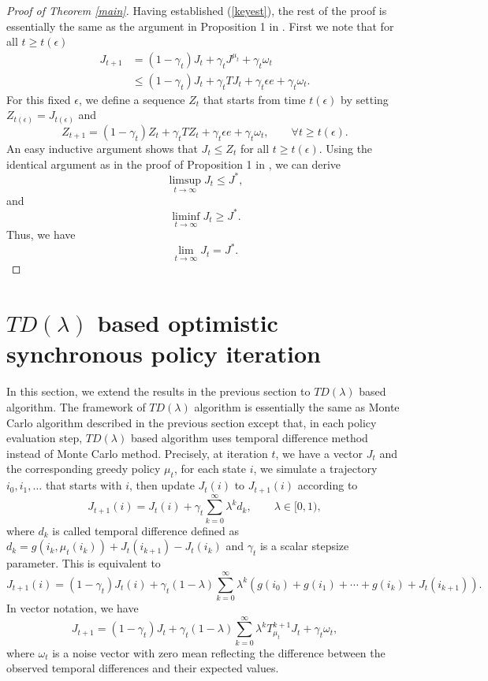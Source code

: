 \documentclass[12pt,a4paper]{amsart}
\numberwithin{equation}{section}
\theoremstyle{plain}
\theoremstyle{definition}
\begin{document}
\begin{proof} [Proof of Theorem \ref{main}]
	Having established (\ref{keyest}),  the rest of the proof is essentially the same as the argument in Proposition 1 in \cite{Ts03}. 
	 First we note that for all $t \ge t(\epsilon)$
	$$
	\begin{aligned}
	J_{t+1} & = (1-\gamma_t) J_t + \gamma_t J^{\mu_t} + \gamma_t \omega_t \\
	& \le (1-\gamma_t) J_t + \gamma_t TJ_t + \gamma_t \epsilon e + \gamma_t \omega_t.
	\end{aligned}
	$$
	For this fixed $\epsilon$,  we define a sequence $Z_t$ that starts from time $t(\epsilon)$ by setting $Z_{t(\epsilon)} = J_{t(\epsilon)}$ and 
	$$
	Z_{t+1} = (1-\gamma_t) Z_t + \gamma_t TZ_t + \gamma_t \epsilon e + \gamma_t \omega_t, \qquad \forall t \ge t(\epsilon).
	$$
	An easy inductive argument shows that $J_t \leq Z_t$ for all $t \ge t(\epsilon)$. Using the identical argument as in the proof of Proposition 1 in \cite{Ts03},  we can derive
	$$
	\limsup_{t  \to \infty} J_t \le J^{*}, 
	$$
	and
	$$
	\liminf_{t \to \infty} J_t \geq J^{*}. 
	$$ 
	Thus, we have 
	$$
	\lim_{t \to \infty} J_t = J^{*}. 
	$$
\end{proof}

\section{$TD(\lambda)$ based optimistic synchronous policy iteration}
In this section, we extend the results in the previous section to $TD(\lambda)$ based algorithm. The framework of $TD(\lambda)$ algorithm is essentially the same as Monte Carlo algorithm described in the previous section except that, in each policy evaluation step, $TD(\lambda)$ based algorithm uses temporal difference method instead of Monte Carlo method. Precisely, at iteration $t$, we have a vector $J_t$ and the corresponding greedy policy $\mu_t$, for each state $i$, we simulate a trajectory $i_0, i_1, \dots$ that starts with $i$, then update $J_t(i)$ to $J_{t+1}(i)$ according to
$$
J_{t+1} (i) = J_t(i)  + \gamma_t \sum_{k=0}^{\infty} \lambda^k d_k, \qquad \lambda \in [0, 1), 
$$
where $d_k$ is called temporal difference defined as $d_k = g(i_k, \mu_t(i_k)) + J_t(i_{k+1}) - J_t(i_k) $ and $\gamma_t$ is a scalar stepsize parameter. This is equivalent to 
$$
J_{t+1}(i) = (1-\gamma_t) J_t(i) + \gamma_t (1-\lambda) \sum_{k=0}^{\infty} \lambda^k \left(g(i_0) + g(i_1) + \cdots + g(i_k) + J_t(i_{k+1}) \right).
$$
In vector notation, we have
\begin{equation} \label{updaterule2}
J_{t+ 1} = (1-\gamma_t)J_t + \gamma_t(1-\lambda) \sum_{k=0}^{\infty} \lambda^k T_{\mu_t}^{k+1} J_t  + \gamma_t \omega_t,
\end{equation}
where $\omega_t$ is a noise vector with zero mean reflecting the difference between the observed temporal differences and their expected values.
\end{document}
